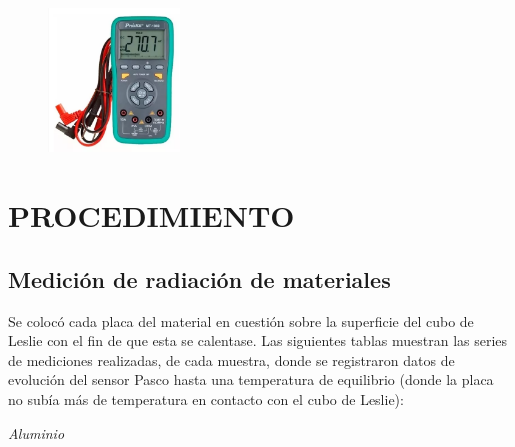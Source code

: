 \documentclass[a4paper]{article}
\begin{document}
            \begin{figure}[h!]
            	\centering
            	\includegraphics[width =3.5cm]{../imagenes/multimetro.png}
            \end{figure}
               
            \newpage
            \thispagestyle{fancy}
                       
    \section{PROCEDIMIENTO}
    	
        \subsection{Medición de radiación de materiales} 
	       \indent Se colocó cada placa del material en cuestión sobre la superficie del cubo de Leslie con el fin de que esta se calentase. Las siguientes tablas muestran las series de mediciones realizadas, de cada muestra, donde se registraron datos de evolución del sensor Pasco hasta una temperatura de equilibrio (donde la placa no subía más de temperatura en contacto con el cubo de Leslie): \\
	       
	       \begin{minipage}[c]{7.5cm}
	       		\centering
           		 \textit{Aluminio} 
           		\vspace{2mm}
	       \end{minipage}
\end{document}
